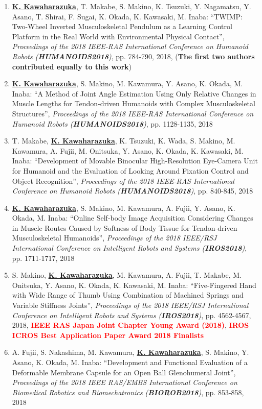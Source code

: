 \documentclass[letterpaper]{article}
\begin{document}
\begin{enumerate}
\item \underline{\textbf{K. Kawaharazuka}}, T. Makabe, S. Makino, K. Tsuzuki, Y. Nagamatsu, Y. Asano, T. Shirai, F. Sugai, K. Okada, K. Kawasaki, M. Inaba: ``TWIMP: Two-Wheel Inverted Musculoskeletal Pendulum as a Learning Control Platform in the Real World with Environmental Physical Contact'', \textit{Proceedings of the 2018 IEEE-RAS International Conference on Humanoid Robots (\textit{\textbf{HUMANOIDS2018}})}, pp. 784-790, 2018, (\textbf{The first two authors contributed equally to this work})
\item \underline{\textbf{K. Kawaharazuka}}, S. Makino, M. Kawamura, Y. Asano, K. Okada, M. Inaba: ``A Method of Joint Angle Estimation Using Only Relative Changes in Muscle Lengths for Tendon-driven Humanoids with Complex Musculoskeletal Structures'', \textit{Proceedings of the 2018 IEEE-RAS International Conference on Humanoid Robots (\textit{\textbf{HUMANOIDS2018}})}, pp. 1128-1135, 2018
\item T. Makabe, \underline{\textbf{K. Kawaharazuka}}, K. Tsuzuki, K. Wada, S. Makino, M. Kawamura, A. Fujii, M. Onitsuka, Y. Asano, K. Okada, K. Kawasaki, M. Inaba: ``Development of Movable Binocular High-Resolution Eye-Camera Unit for Humanoid and the Evaluation of Looking Around Fixation Control and Object Recognition'', \textit{Proceedings of the 2018 IEEE-RAS International Conference on Humanoid Robots (\textit{\textbf{HUMANOIDS2018}})}, pp. 840-845, 2018
\item \underline{\textbf{K. Kawaharazuka}}, S. Makino, M. Kawamura, A. Fujii, Y. Asano, K. Okada, M. Inaba: ``Online Self-body Image Acquisition Considering Changes in Muscle Routes Caused by Softness of Body Tissue for Tendon-driven Musculoskeletal Humanoids'', \textit{Proceedings of the 2018 IEEE/RSJ International Conference on Intelligent Robots and Systems (\textit{\textbf{IROS2018}})}, pp. 1711-1717, 2018
\item S. Makino, \underline{\textbf{K. Kawaharazuka}}, M. Kawamura, A. Fujii, T. Makabe, M. Onitsuka, Y. Asano, K. Okada, K. Kawasaki, M. Inaba: ``Five-Fingered Hand with Wide Range of Thumb Using Combination of Machined Springs and Variable Stiffness Joints'', \textit{Proceedings of the 2018 IEEE/RSJ International Conference on Intelligent Robots and Systems (\textit{\textbf{IROS2018}})}, pp. 4562-4567, 2018, \textbf{\textcolor{red}{IEEE RAS Japan Joint Chapter Young Award (2018)}}, \textbf{\textcolor{red}{IROS ICROS Best Application Paper Award 2018 Finalists}}
\item A. Fujii, S. Nakashima, M. Kawamura, \underline{\textbf{K. Kawaharazuka}}, S. Makino, Y. Asano, K. Okada, M. Inaba: ``Development and Functional Evaluation of a Deformable Membrane Capsule for an Open Ball Glenohumeral Joint'', \textit{Proceedings of the 2018 IEEE RAS/EMBS International Conference on Biomedical Robotics and Biomechatronics (\textit{\textbf{BIOROB2018}})}, pp. 853-858, 2018

\end{enumerate}
\end{document}
